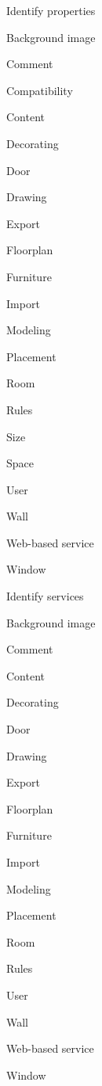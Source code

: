 		\clearpage
		
		\begin{paracol}{4}
			
			
			Identify properties\\
			\begin{compactitem}
				\item Background image
				\item Comment
				\item Compatibility
				\item Content
				\item Decorating
				\item Door
				\item Drawing
				\item Export
				\item Floorplan
				\item Furniture
				\item Import
				\item Modeling
				\item Placement
				\item Room
				\item Rules
				\item Size
				\item Space
				\item User
				\item Wall
				\item Web-based service
				\item Window
			\end{compactitem}
			
			\bigskip
			
			\switchcolumn
			Identify services\\
			\begin{compactitem}
				\item Background image
				\item Comment
				\item Content
				\item Decorating
				\item Door
				\item Drawing
				\item Export
				\item Floorplan
				\item Furniture
				\item Import
				\item Modeling
				\item Placement
				\item Room
				\item Rules
				\item User
				\item Wall
				\item Web-based service
				\item Window
			\end{compactitem}
			

\end{paracol}
